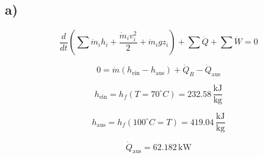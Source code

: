 

\subsection*{a)}

\[
\frac{d}{dt} \left( \sum \dot{m}_i h_i + \frac{\dot{m}_i v_i^2}{2} + \dot{m}_i g z_i \right) + \sum \dot{Q} + \sum \dot{W} = 0
\]

\[
0 = \dot{m} (h_{\text{ein}} - h_{\text{aus}}) + \dot{Q}_R - \dot{Q}_{\text{aus}}
\]

\[
h_{\text{ein}} = h_f (T = 70^\circ C) = 232.58 \, \frac{\text{kJ}}{\text{kg}}
\]

\[
h_{\text{aus}} = h_f (100^\circ C = T) = 419.04 \, \frac{\text{kJ}}{\text{kg}}
\]

\[
\dot{Q}_{\text{aus}} = 62.182 \, \text{kW}
\]